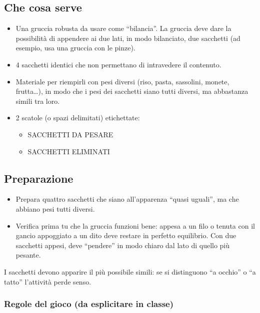 \subsection{Che cosa serve}

\begin{itemize}
\item
  Una gruccia robusta da usare come ``bilancia''. La gruccia deve dare la possibilità di appendere ai due lati, in modo bilanciato, due sacchetti (ad esempio, usa una gruccia con le pinze).
\item
  4 sacchetti identici che non permettano di intravedere il contenuto.
\item
  Materiale per riempirli con pesi diversi (riso, pasta, sassolini, monete, frutta\ldots), in modo che i pesi dei sacchetti siano tutti diversi, ma abbastanza simili tra loro.
\item
  2 scatole (o spazi delimitati) etichettate:

  \begin{itemize}
  \item
    SACCHETTI DA PESARE
  \item
    SACCHETTI ELIMINATI
  \end{itemize}
\end{itemize}

\subsection{Preparazione}

\begin{itemize}
\item
  Prepara quattro sacchetti che siano all'apparenza ``quasi uguali'', ma che abbiano pesi tutti diversi.
\item
  Verifica prima tu che la gruccia funzioni bene: appesa a un filo o tenuta con il gancio appoggiato a un dito deve restare in perfetto equilibrio. Con due sacchetti appesi, deve ``pendere'' in modo chiaro dal lato di quello più pesante.
\end{itemize}

\begin{attenzione}\label{aspetto-a-cui-fare-attenzione-3}


I sacchetti devono apparire il più possibile simili: se si distinguono ``a occhio'' o ``a tatto'' l'attività perde senso.
\end{attenzione}

\subsubsection{Regole del gioco (da esplicitare in classe)}


